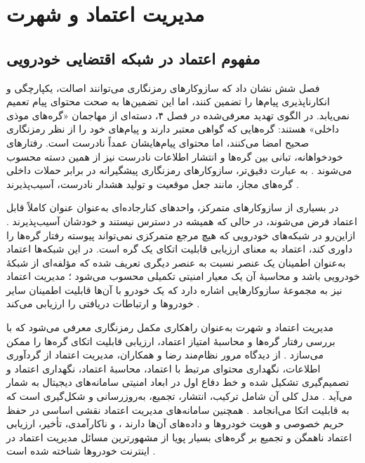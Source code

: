 \section{مدیریت اعتماد و شهرت}

\subsection{مفهوم اعتماد در شبکه اقتضایی خودرویی}

فصل شش نشان داد که سازوکارهای رمزنگاری می‌توانند اصالت، یکپارچگی و انکارناپذیری پیام‌ها را تضمین کنند، اما این تضمین‌ها به صحت محتوای پیام تعمیم نمی‌یابد. در الگوی تهدید معرفی‌شده در فصل ۴، دسته‌ای از مهاجمان «گره‌های موذی داخلی» هستند: گره‌هایی که گواهی معتبر دارند و پیام‌های خود را از نظر رمزنگاری صحیح امضا می‌کنند، اما محتوای پیام‌هایشان عمداً نادرست است. رفتارهای خودخواهانه، تبانی بین گره‌ها و انتشار اطلاعات نادرست نیز از همین دسته محسوب می‌شوند \cite{farsimadanReviewSecurityChallenges2025}. به عبارت دقیق‌تر، سازوکارهای رمزنگاری پیشگیرانه در برابر حملات داخلی گره‌های مجاز، مانند جعل موقعیت و تولید هشدار نادرست، آسیب‌پذیرند \cite{farsimadanReviewSecurityChallenges2025}.

در بسیاری از سازوکارهای متمرکز، واحدهای کنارجاده‌ای به‌عنوان عنوان کاملاً قابل اعتماد فرض می‌شوند، در حالی که همیشه در دسترس نیستند و خودشان آسیب‌پذیرند \cite{farsimadanReviewSecurityChallenges2025}. ازاین‌رو در شبکه‌های خودرویی که هیچ مرجع متمرکزی نمی‌تواند پیوسته رفتار گره‌ها را داوری کند، اعتماد به معنای ارزیابی قابلیت اتکای یک گره است. در این شبکه‌ها اعتماد به‌عنوان اطمینان یک عنصر نسبت به عنصر دیگری تعریف شده که مؤلفه‌ای از شبکهٔ خودرویی باشد و محاسبهٔ آن یک معیار امنیتی تکمیلی محسوب می‌شود \cite{farsimadanReviewSecurityChallenges2025}؛ مدیریت اعتماد نیز به مجموعهٔ سازوکارهایی اشاره دارد که یک خودرو با آن‌ها قابلیت اطمینان سایر خودروها و ارتباطات دریافتی را ارزیابی می‌کند \cite{farsimadanReviewSecurityChallenges2025}.

مدیریت اعتماد و شهرت به‌عنوان راهکاری مکمل رمزنگاری معرفی می‌شود که با بررسی رفتار گره‌ها و محاسبهٔ امتیاز اعتماد، ارزیابی قابلیت اتکای گره‌ها را ممکن می‌سازد \cite{razaBlockchainBasedReputationTrust2024}. از دیدگاه مرور نظام‌مند رضا و همکاران، مدیریت اعتماد از گردآوری اطلاعات، نگهداری محتوای مرتبط با اعتماد، محاسبهٔ اعتماد، نگهداری اعتماد و تصمیم‌گیری تشکیل شده و خط دفاع اول در ابعاد امنیتی سامانه‌های دیجیتال به شمار می‌آید \cite{razaBlockchainBasedReputationTrust2024}. مدل کلی آن شامل ترکیب، انتشار، تجمیع، به‌روزرسانی و شکل‌گیری است که به قابلیت اتکا می‌انجامد \cite{razaBlockchainBasedReputationTrust2024}. همچنین سامانه‌های مدیریت اعتماد نقشی اساسی در حفظ حریم خصوصی و هویت خودروها و داده‌های آن‌ها دارند \cite{razaBlockchainBasedReputationTrust2024}، و ناکارآمدی، تأخیر، ارزیابی اعتماد ناهمگن و تجمیع بر گره‌های بسیار پویا از مشهورترین مسائل مدیریت اعتماد در اینترنت خودروها شناخته شده است \cite{razaBlockchainBasedReputationTrust2024}.

